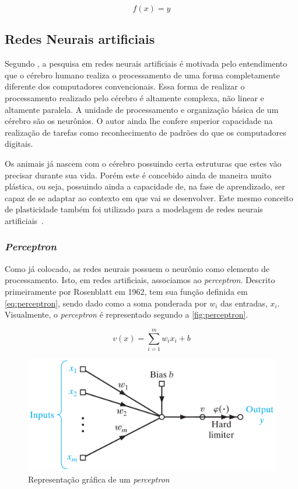 \documentclass[
    12pt,
    oneside,
    a4paper,
    english,
    brazil
]{abntex2}
\begin{document}
\begin{equation}
    \label{eq:sisCla}
    f(x) = \hat{y}
\end{equation}

\subsection{Redes Neurais artificiais}

Segundo  , a pesquisa  em  redes  neurais artificiais  é
motivada pelo entendimento que o cérebro  humano realiza o processamento de uma
forma  completamente diferente  dos computadores  convencionais. Essa  forma de
realizar  o processamento  realizado  pelo cérebro  é  altamente complexa,  não
linear e altamente paralela. A unidade de processamento e organização básica de
um cérebro são  os neurônios. O autor ainda lhe  confere superior capacidade na
realização de  tarefas como  reconhecimento de padrões  do que  os computadores
digitais.

Os animais  já nascem com  o cérebro possuindo  certa estruturas que  estes vão
precisar  durante sua  vida.  Porém este  é concebido  ainda  de maneira  muito
plástica, ou seja, possuindo ainda a capacidade de, na fase de aprendizado, ser
capaz de se adaptar ao contexto em  que vai se desenvolver. Este mesmo conceito
de  plasticidade  também foi  utilizado  para  a  modelagem de  redes  neurais
artificiais~\cite{haykin2009}.

\subsubsection{\textit{Perceptron}}

Como  já  colocado, as  redes  neurais  possuem  o  neurônio como  elemento  de
processamento. Isto, em  redes artificiais, associamos ao  \textit{perceptron}.
Descrito primeiramente  por Rosenblatt em  1962,  tem sua função  definida em
\autoref{eq:perceptron},  sendo dado  como  a  soma  ponderada  por  $w_i$  das
entradas,  $x_i$. Visualmente, o \textit{perceptron}  é representado  segundo a
\autoref{fig:perceptron}.

\begin{equation}\label{eq:perceptron}
    v(x) = \sum_{i=1}^{m}{w_i  x_i + b}
\end{equation}

\begin{figure}[ht]
    \centering
    \caption{Representação gráfica de um \textit{perceptron}}\label{fig:perceptron}
    \includegraphics[width=.5\linewidth]{images/perceptron.png}
\end{figure}
\end{document}
